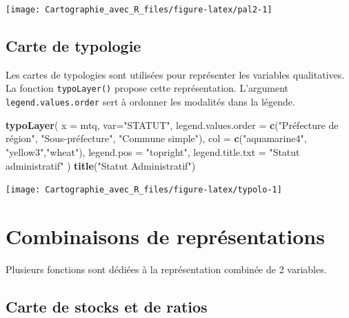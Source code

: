 \documentclass[]{book}
\newenvironment{Shaded}{\begin{snugshade}}{\end{snugshade}}
\newcommand{\KeywordTok}[1]{\textcolor[rgb]{0.13,0.29,0.53}{\textbf{#1}}}
\newcommand{\DataTypeTok}[1]{\textcolor[rgb]{0.13,0.29,0.53}{#1}}
\newcommand{\StringTok}[1]{\textcolor[rgb]{0.31,0.60,0.02}{#1}}
\newcommand{\NormalTok}[1]{#1}
\begin{document}
\begin{center}\texttt{[image: Cartographie\_avec\_R\_files/figure-latex/pal2-1]} \end{center}

\subsection{Carte de typologie}\label{carte-de-typologie}

Les cartes de typologies sont utilisées pour représenter les variables
qualitatives. La fonction \texttt{typoLayer()} propose cette
représentation. L'argument \texttt{legend.values.order} sert à ordonner
les modalités dans la légende.

\begin{Shaded}
\begin{Highlighting}[]
\KeywordTok{typoLayer}\NormalTok{(}
  \DataTypeTok{x =}\NormalTok{ mtq, }
  \DataTypeTok{var=}\StringTok{"STATUT"}\NormalTok{,}
  \DataTypeTok{legend.values.order =} \KeywordTok{c}\NormalTok{(}\StringTok{"Préfecture de région"}\NormalTok{,}
                          \StringTok{"Sous-préfecture"}\NormalTok{, }
                          \StringTok{"Commune simple"}\NormalTok{),}
  \DataTypeTok{col =} \KeywordTok{c}\NormalTok{(}\StringTok{"aquamarine4"}\NormalTok{, }\StringTok{"yellow3"}\NormalTok{,}\StringTok{"wheat"}\NormalTok{),}
  \DataTypeTok{legend.pos =} \StringTok{"topright"}\NormalTok{,}
  \DataTypeTok{legend.title.txt =} \StringTok{"Statut administratif"}
\NormalTok{)}
\KeywordTok{title}\NormalTok{(}\StringTok{"Statut Administratif"}\NormalTok{)}
\end{Highlighting}
\end{Shaded}

\begin{center}\texttt{[image: Cartographie\_avec\_R\_files/figure-latex/typolo-1]} \end{center}

\section{Combinaisons de
représentations}\label{combinaisons-de-representations}

Plusieurs fonctions sont dédiées à la représentation combinée de 2
variables.

\subsection{Carte de stocks et de
ratios}\label{carte-de-stocks-et-de-ratios}
\end{document}
